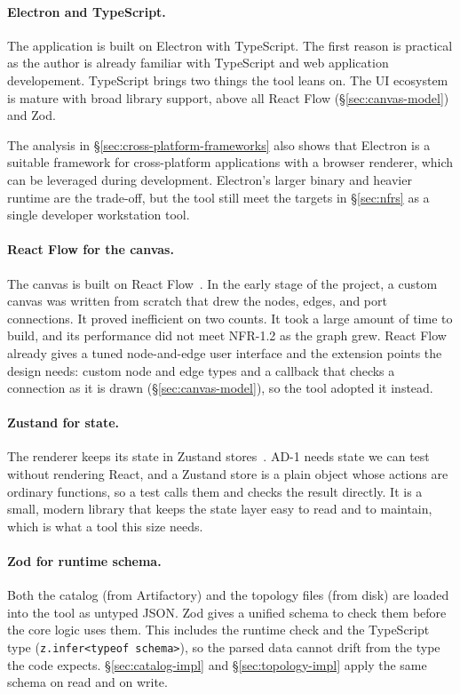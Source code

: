 \paragraph{Electron and TypeScript.}
The application is built on Electron with TypeScript. The first reason is practical as the author is already familiar with TypeScript and web application developement. TypeScript brings two things the tool leans on. The UI ecosystem is mature with broad library support, above all React Flow (\S\ref{sec:canvas-model}) and Zod.

The analysis in \S\ref{sec:cross-platform-frameworks} also shows that Electron is a suitable framework for cross-platform applications with a browser renderer, which can be leveraged during development. Electron's larger binary and heavier runtime are the trade-off, but the tool still meet the targets in \S\ref{sec:nfrs} as a single developer workstation tool.

\paragraph{React Flow for the canvas.}
The canvas is built on React Flow~\cite{react_flow}. In the early stage of the project, a custom canvas was written from scratch that drew the nodes, edges, and port connections. It proved inefficient on two counts. It took a large amount of time to build, and its performance did not meet NFR-1.2 as the graph grew. React Flow already gives a tuned node-and-edge user interface and the extension points the design needs: custom node and edge types and a callback that checks a connection as it is drawn (\S\ref{sec:canvas-model}), so the tool adopted it instead.

\paragraph{Zustand for state.}
The renderer keeps its state in Zustand stores~\cite{zustand}. AD-1 needs state we can test without rendering React, and a Zustand store is a plain object whose actions are ordinary functions, so a test calls them and checks the result directly. It is a small, modern library that keeps the state layer easy to read and to maintain, which is what a tool this size needs.

\paragraph{Zod for runtime schema.}
Both the catalog (from Artifactory) and the topology files (from disk) are loaded into the tool as untyped JSON. Zod gives a unified schema to check them before the core logic uses them. This includes the runtime check and the TypeScript type (\texttt{z.infer<typeof schema>}), so the parsed data cannot drift from the type the code expects. \S\ref{sec:catalog-impl} and \S\ref{sec:topology-impl} apply the same schema on read and on write.

